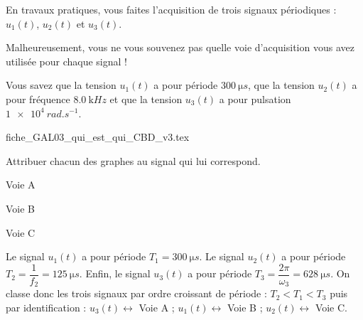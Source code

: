 En travaux pratiques, vous faites l'acquisition de trois signaux périodiques : $u_1(t)$, $u_2(t)$ et $u_3(t)$. 

Malheureusement, vous ne vous souvenez pas quelle voie d'acquisition vous avez utilisée pour chaque signal !

Vous savez que la tension $u_1(t)$ a pour période $\SI{300}{\micro s}$, que la tension $u_2(t)$ a pour fréquence $\SI{8,0}{\kilo Hz}$ et que la tension $u_3(t)$ a pour pulsation $\SI{1e4}{rad.s^{-1}}$.

\def\ratioGraphiqueX{1.12}
\def\ratioGraphiqueY{0.8}

\minusMedskip

\begin{center}
{fiche_GAL03_qui_est_qui_CBD_v3.tex}
\end{center}

Attribuer chacun des graphes au signal qui lui correspond.

\debutEntrainement


\begin{enonce}
Voie A 
\end{enonce}




\begin{enonce}
Voie B 
\end{enonce}




\begin{enonce}
Voie C 
\end{enonce}


\begin{corrige}
Le signal $u_1(t)$ a pour période $T_1=\SI{300}{\micro s}$. Le signal $u_2(t)$ a pour période $T_2=\dfrac{1}{f_2}=\SI{125}{\micro s}$. Enfin, le signal $u_3(t)$ a pour période $T_3=\dfrac{2\pi}{\omega_3}=\SI{628}{\micro s}$. On classe donc les trois signaux par ordre croissant de période : $T_2<T_1<T_3$ puis par identification : $u_3(t)\longleftrightarrow$ Voie A ; $u_1(t)\longleftrightarrow$ Voie B ; $u_2(t)\longleftrightarrow$ Voie C.
\end{corrige}

